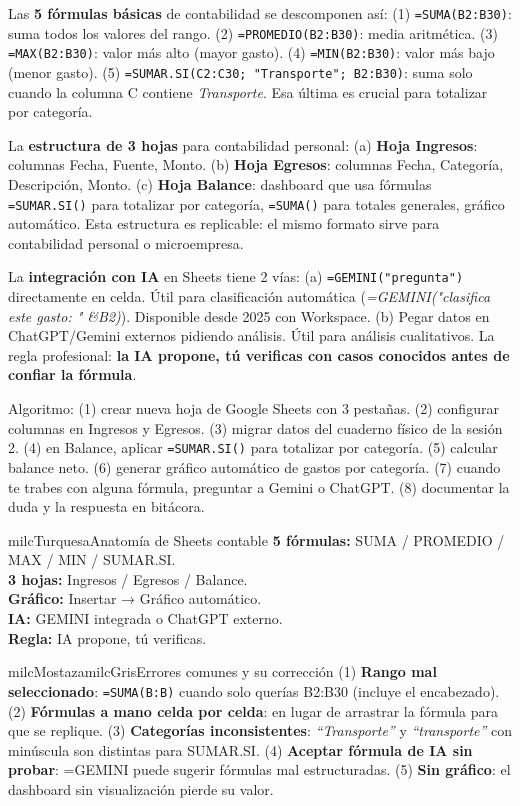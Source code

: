 \documentclass[11pt,letterpaper]{article}
\newcommand{\milcpaso}[3]{%
\Needspace{4\baselineskip}%
\begin{tcolorbox}[enhanced,colback=white,colframe=milcLinea,arc=1.5mm,boxrule=.9pt,
  left=14mm,right=4mm,top=3mm,bottom=3mm,before skip=4pt,after skip=4pt,
  fontupper=\RaggedRight,
  overlay={\node[anchor=north west,circle,fill=#2,text=white,inner sep=0pt,
    minimum size=7.4mm,font=\sffamily\bfseries\small]
    at ([xshift=3.6mm,yshift=-3.2mm]frame.north west) {#1};}]
#3
\end{tcolorbox}}
\begin{document}
\milcpaso{1}{milcTurquesa}{Las \textbf{5 fórmulas básicas} de contabilidad se descomponen así: (1) \texttt{=SUMA(B2:B30)}: suma todos los valores del rango. (2) \texttt{=PROMEDIO(B2:B30)}: media aritmética. (3) \texttt{=MAX(B2:B30)}: valor más alto (mayor gasto). (4) \texttt{=MIN(B2:B30)}: valor más bajo (menor gasto). (5) \texttt{=SUMAR.SI(C2:C30; "Transporte"; B2:B30)}: suma solo cuando la columna C contiene \emph{Transporte}. Esa última es crucial para totalizar por categoría.}
\milcpaso{2}{milcTurquesa}{La \textbf{estructura de 3 hojas} para contabilidad personal: (a) \textbf{Hoja Ingresos}: columnas Fecha, Fuente, Monto. (b) \textbf{Hoja Egresos}: columnas Fecha, Categoría, Descripción, Monto. (c) \textbf{Hoja Balance}: dashboard que usa fórmulas \texttt{=SUMAR.SI()} para totalizar por categoría, \texttt{=SUMA()} para totales generales, gráfico automático. Esta estructura es replicable: el mismo formato sirve para contabilidad personal o microempresa.}
\milcpaso{3}{milcTurquesa}{La \textbf{integración con IA} en Sheets tiene 2 vías: (a) \texttt{=GEMINI("pregunta")} directamente en celda. Útil para clasificación automática (\emph{=GEMINI("clasifica este gasto: " \&B2)}). Disponible desde 2025 con Workspace. (b) Pegar datos en ChatGPT/Gemini externos pidiendo análisis. Útil para análisis cualitativos. La regla profesional: \textbf{la IA propone, tú verificas con casos conocidos antes de confiar la fórmula}.}
\milcpaso{4}{milcTurquesa}{Algoritmo: (1) crear nueva hoja de Google Sheets con 3 pestañas. (2) configurar columnas en Ingresos y Egresos. (3) migrar datos del cuaderno físico de la sesión 2. (4) en Balance, aplicar \texttt{=SUMAR.SI()} para totalizar por categoría. (5) calcular balance neto. (6) generar gráfico automático de gastos por categoría. (7) cuando te trabes con alguna fórmula, preguntar a Gemini o ChatGPT. (8) documentar la duda y la respuesta en bitácora.}

\begin{drawbox}{milcTurquesa}{Anatomía de Sheets contable}
\textbf{5 fórmulas:} SUMA / PROMEDIO / MAX / MIN / SUMAR.SI. \\[1mm] \textbf{3 hojas:} Ingresos / Egresos / Balance. \\[1mm] \textbf{Gráfico:} Insertar → Gráfico automático. \\[1mm] \textbf{IA:} GEMINI integrada o ChatGPT externo. \\[1mm] \textbf{Regla:} IA propone, tú verificas.
\end{drawbox}

\begin{softbox}{milcMostaza}{milcGris}{Errores comunes y su corrección}
(1) \textbf{Rango mal seleccionado}: \texttt{=SUMA(B:B)} cuando solo querías B2:B30 (incluye el encabezado). (2) \textbf{Fórmulas a mano celda por celda}: en lugar de arrastrar la fórmula para que se replique. (3) \textbf{Categorías inconsistentes}: \emph{``Transporte''} y \emph{``transporte''} con minúscula son distintas para SUMAR.SI. (4) \textbf{Aceptar fórmula de IA sin probar}: =GEMINI puede sugerir fórmulas mal estructuradas. (5) \textbf{Sin gráfico}: el dashboard sin visualización pierde su valor.
\end{softbox}
\end{document}
